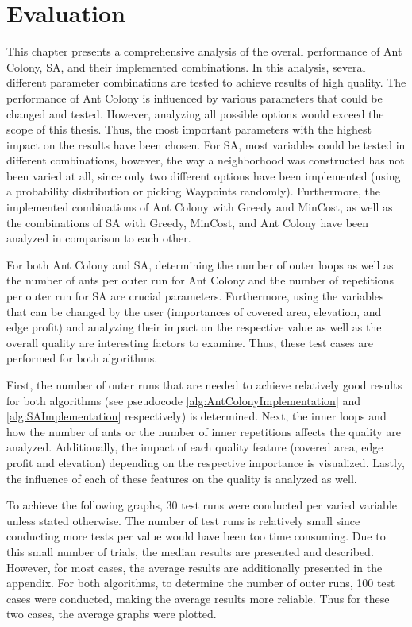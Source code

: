 \chapter{Evaluation}
\label{chapter:evaluation}

This chapter presents a comprehensive analysis of the overall performance of Ant Colony, SA, and their implemented combinations.
In this analysis, several different parameter combinations are tested to achieve results of high quality.
The performance of Ant Colony is influenced by various parameters that could be changed and tested. 
However, analyzing all possible options would exceed the scope of this thesis.
Thus, the most important parameters with the highest impact on the results have been chosen.
For SA, most variables could be tested in different combinations, however, the way a neighborhood was constructed has not been varied at all, since only two different options have been implemented (using a probability distribution or picking Waypoints randomly).
Furthermore, the implemented combinations of Ant Colony with Greedy and MinCost, as well as the combinations of SA with Greedy, MinCost, and Ant Colony have been analyzed in comparison to each other. 


For both Ant Colony and SA, determining the number of outer loops as well as the number of ants per outer run for Ant Colony and the number of repetitions per outer run for SA are crucial parameters.
Furthermore, using the variables that can be changed by the user (importances of covered area, elevation, and edge profit) and analyzing their impact on the respective value as well as the overall quality are interesting factors to examine.
Thus, these test cases are performed for both algorithms.

First, the number of outer runs that are needed to achieve relatively good results for both algorithms (see pseudocode \ref{alg:AntColonyImplementation} and \ref{alg:SAImplementation} respectively) is determined.
Next, the inner loops and how the number of ants or the number of inner repetitions affects the quality are analyzed.
Additionally, the impact of each quality feature (covered area, edge profit and elevation) depending on the respective importance is visualized.
Lastly, the influence of each of these features on the quality is analyzed as well.

To achieve the following graphs, 30 test runs were conducted per varied variable unless stated otherwise.
The number of test runs is relatively small since conducting more tests per value would have been too time consuming.
Due to this small number of trials, the median results are presented and described.
However, for most cases, the average results are additionally presented in the appendix.
For both algorithms, to determine the number of outer runs, 100 test cases were conducted, making the average results more reliable.
Thus for these two cases, the average graphs were plotted.

